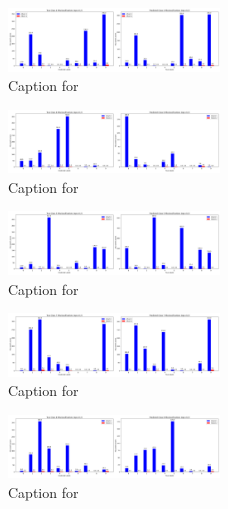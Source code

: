 \documentclass[12pt, a4paper]{article}
\begin{document}
\begin{figure}[ht]
\centering
\includegraphics[width=0.5\textwidth]{combined_class_boundary_pgd/combined_class_4_misclassifications_eps_0.2.png}
\caption{Caption for }
\label{fig:combined_class_4_misclassifications_eps_0.2.png}
\end{figure}

\begin{figure}[ht]
\centering
\includegraphics[width=0.5\textwidth]{combined_class_boundary_pgd/combined_class_6_misclassifications_eps_0.2.png}
\caption{Caption for }
\label{fig:combined_class_6_misclassifications_eps_0.2.png}
\end{figure}

\begin{figure}[ht]
\centering
\includegraphics[width=0.5\textwidth]{combined_class_boundary_pgd/combined_class_5_misclassifications_eps_0.2.png}
\caption{Caption for }
\label{fig:combined_class_5_misclassifications_eps_0.2.png}
\end{figure}

\begin{figure}[ht]
\centering
\includegraphics[width=0.5\textwidth]{combined_class_boundary_pgd/combined_class_7_misclassifications_eps_0.2.png}
\caption{Caption for }
\label{fig:combined_class_7_misclassifications_eps_0.2.png}
\end{figure}

\begin{figure}[ht]
\centering
\includegraphics[width=0.5\textwidth]{combined_class_boundary_pgd/combined_class_8_misclassifications_eps_0.2.png}
\caption{Caption for }
\label{fig:combined_class_8_misclassifications_eps_0.2.png}
\end{figure}
\end{document}
